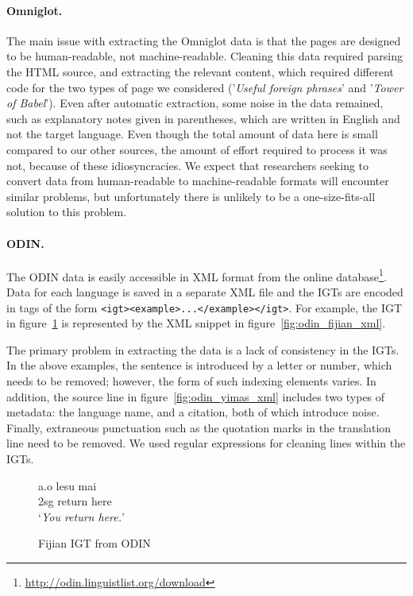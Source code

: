 \paragraph{Omniglot.}
The main issue with extracting the Omniglot data is that the pages are designed to be human-readable, not machine-readable.  Cleaning this data required parsing the HTML source, and extracting the relevant content, which required different code for the two types of page we considered ('\emph{Useful foreign phrases}' and '\emph{Tower of Babel}').  Even after automatic extraction, some noise in the data remained, such as explanatory notes given in parentheses, which are written in English and not the target language.  Even though the total amount of data here is small compared to our other sources, the amount of effort required to process it was not, because of these idiosyncracies.  We expect that researchers seeking to convert data from human-readable to machine-readable formats will encounter similar problems, but unfortunately there is unlikely to be a one-size-fits-all solution to this problem.


\paragraph{ODIN.}
The ODIN data is easily accessible in XML format from the online database\footnote{\url{http://odin.linguistlist.org/download}}. Data for each language is saved in a separate XML file and the IGTs are encoded in tags of the form \texttt{<igt><example>...</example></igt>}.  For example, the IGT in figure~\ref{fig:odin_fijian} is represented by the XML snippet in figure~\ref{fig:odin_fijian_xml}.

The primary problem in extracting the data is a lack of consistency in the IGTs. In the above examples, the sentence is introduced by a letter or number, which needs to be removed; however, the form of such indexing elements varies. In addition, the source line in figure~\ref{fig:odin_yimas_xml} includes two types of metadata: the language name, and a citation, both of which introduce noise.  Finally, extraneous punctuation such as the quotation marks in the translation line need to be removed. We used regular expressions for cleaning lines within the IGTs.

\begin{figure}[t]
 a.\quad o lesu mai \\
\indent \qquad\qquad 2sg return here \\
\indent \qquad\qquad `\emph{You return here.}' \\
\caption{Fijian IGT from ODIN} \label{fig:odin_fijian}
\end{figure}


